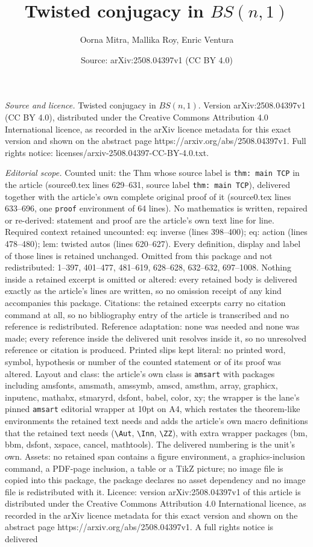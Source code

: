 \documentclass[10pt,a4paper]{amsart}
\title[Twisted conjugacy in $BS(n, 1)$]{Twisted conjugacy in $BS(n, 1)$}
\author{Oorna Mitra, Mallika Roy, Enric Ventura}
\date{Source: arXiv:2508.04397v1 (CC BY 4.0)}
\begin{document}
\maketitle

\noindent\emph{Source and licence.} Twisted conjugacy in $BS(n, 1)$. Version arXiv:2508.04397v1 (CC BY 4.0), distributed under the Creative Commons Attribution 4.0 International licence, as recorded in the arXiv licence metadata for this exact version and shown on the abstract page https://arxiv.org/abs/2508.04397v1. Full rights notice: licenses/arxiv-2508.04397-CC-BY-4.0.txt.\par\smallskip

\noindent\textit{Editorial scope.} Counted unit: the Thm whose source label is \texttt{thm: main TCP} in the article (source0.tex lines 629--631, source label \texttt{thm: main TCP}), delivered together with the article's own complete original proof of it (source0.tex lines 633--696, one \texttt{proof} environment of 64 lines). No mathematics is written, repaired or re-derived: statement and proof are the article's own text line for line. Required context retained uncounted: eq: inverse (lines 398--400); eq: action (lines 478--480); lem: twisted autos (lines 620--627). Every definition, display and label of those lines is retained unchanged. Omitted from this package and not redistributed: 1--397, 401--477, 481--619, 628--628, 632--632, 697--1008. Nothing inside a retained excerpt is omitted or altered: every retained body is delivered exactly as the article's lines are written, so no omission receipt of any kind accompanies this package. Citations: the retained excerpts carry no citation command at all, so no bibliography entry of the article is transcribed and no reference is redistributed. Reference adaptation: none was needed and none was made; every reference inside the delivered unit resolves inside it, so no unresolved reference or citation is produced. Printed slips kept literal: no printed word, symbol, hypothesis or number of the counted statement or of its proof was altered. Layout and class: the article's own class is \texttt{amsart} with packages including amsfonts, amsmath, amssymb, amscd, amsthm, array, graphicx, inputenc, mathabx, stmaryrd, dsfont, babel, color, xy; the wrapper is the lane's pinned \texttt{amsart} editorial wrapper at 10pt on A4, which restates the theorem-like environments the retained text needs and adds the article's own macro definitions that the retained text needs (\texttt{\textbackslash Aut}, \texttt{\textbackslash Inn}, \texttt{\textbackslash ZZ}), with extra wrapper packages (bm, bbm, dsfont, xspace, cancel, mathtools). The delivered numbering is the unit's own. Assets: no retained span contains a figure environment, a graphics-inclusion command, a PDF-page inclusion, a table or a TikZ picture; no image file is copied into this package, the package declares no asset dependency and no image file is redistributed with it. Licence: version arXiv:2508.04397v1 of this article is distributed under the Creative Commons Attribution 4.0 International licence, as recorded in the arXiv licence metadata for this exact version and shown on the abstract page https://arxiv.org/abs/2508.04397v1. A full rights notice is delivered 
\end{document}
